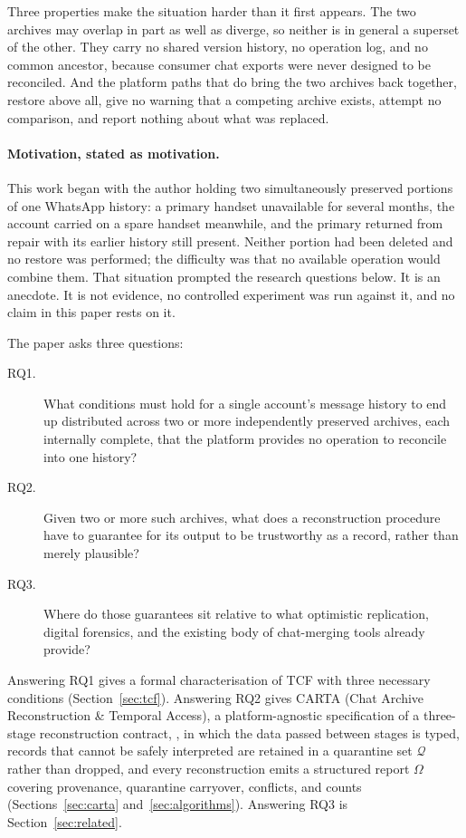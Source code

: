 Three properties make the situation harder than it first appears. The two
archives may overlap in part as well as diverge, so neither is in general a
superset of the other. They carry no shared version history, no operation log,
and no common ancestor, because consumer chat exports were never designed to be
reconciled.
And the platform paths that do bring the two archives back together, restore
above all, give no warning that a competing archive exists, attempt no
comparison, and report nothing about what was replaced.

\paragraph{Motivation, stated as motivation.}
This work began with the author holding two simultaneously preserved
portions of one WhatsApp history: a primary handset unavailable for several
months, the account carried on a spare handset meanwhile, and the primary
returned from repair with its earlier history still present. Neither portion
had been deleted and no restore was performed; the difficulty was that no
available operation would combine them. That situation prompted the research
questions below. It is an anecdote. It is not evidence, no controlled experiment
was run against it, and no claim in this paper rests on it.

The paper asks three questions:

\begin{description}
  \item[RQ1.] What conditions must hold for a single account's message history
to end up distributed across two or more independently preserved archives,
each internally complete, that the platform provides no operation to
reconcile into one history?
  \item[RQ2.] Given two or more such archives, what does a reconstruction
    procedure have to guarantee for its output to be trustworthy as a record,
    rather than merely plausible?
  \item[RQ3.] Where do those guarantees sit relative to what optimistic
    replication, digital forensics, and the existing body of chat-merging tools
    already provide?
\end{description}

Answering RQ1 gives a formal characterisation of TCF with three necessary
conditions (Section~\ref{sec:tcf}). Answering RQ2 gives CARTA (Chat Archive
Reconstruction \& Temporal Access), a platform-agnostic specification of a
three-stage reconstruction contract, \carta, in which the data passed between
stages is typed, records that cannot be safely interpreted are retained in a
quarantine set $\mathcal{Q}$ rather than dropped, and every reconstruction emits
a structured report $\Omega$ covering provenance, quarantine carryover,
conflicts, and counts (Sections~\ref{sec:carta} and~\ref{sec:algorithms}).
Answering RQ3 is Section~\ref{sec:related}.

